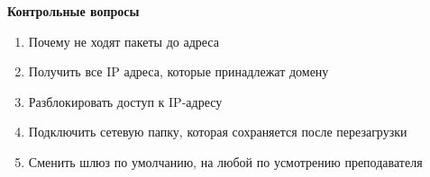 \documentclass[a4paper,12pt]{article}
\begin{document}
  \begin{center}
   {\bf Контрольные вопросы}
  \end{center}
  \begin{flushleft}
    \begin{enumerate}
     \item Почему не ходят пакеты до адреса 
     \item Получить все IP адреса, которые принадлежат домену 
     \item Разблокировать доступ к IP-адресу 
     \item Подключить сетевую папку, которая сохраняется после перезагрузки
     \item Сменить шлюз по умолчанию, на любой по усмотрению преподавателя
      
    \end{enumerate}

  \end{flushleft}
\end{document}
